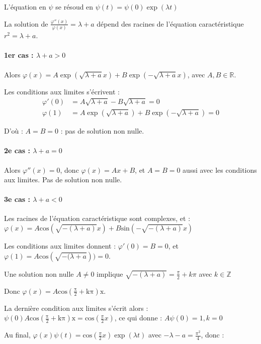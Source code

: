 \documentclass[french]{article}
\begin{document}
L'équation en $ \psi $ se résoud en $ \psi(t)=\psi(0)\exp(\lambda t) $

La solution de $ \frac{\varphi''(x)}{\varphi(x)}=\lambda+a $ dépend des racines de l'équation caractéristique $ r^{2}=\lambda+a $.

\paragraph{1er cas : $\lambda + a > 0$}

Alors $ \varphi(x)=A\exp(\sqrt{\lambda+a}x)+B\exp(-\sqrt{\lambda+a}x) $, avec $ A,B \in \mathbb{R} $.

Les conditions aux limites s'écrivent :
\begin{align}
\varphi'(0)&=A \sqrt{\lambda+a} - B \sqrt{\lambda+a}=0 \\
\varphi(1)&= A\exp(\sqrt{\lambda+a})+B\exp(-\sqrt{\lambda+a})=0 
\end{align}

D'où : $ A = B = 0 $ : pas de solution non nulle.

\paragraph{2e cas : $\lambda + a = 0$}

Alors $ \varphi''(x)=0 $, donc $ \varphi(x)=Ax+B $, et $ A=B=0 $ aussi avec les conditions aux limites. Pas de solution non nulle.

\paragraph{3e cas : $\lambda + a < 0$}

Les racines de l'équation caractéristique sont complexes, et : $ \varphi(x)=A\mathrm{cos}(\sqrt{-(\lambda+a)}x)+B\mathrm{sin}(-\sqrt{-(\lambda+a)}x) $

Les conditions aux limites donnent : $ \varphi'(0)=B=0 $, et $ \varphi(1)=A \mathrm{cos}(\sqrt{-(\lambda+a}))=0 $. 

Une solution non nulle $ A\neq 0 $ implique $ \sqrt{-(\lambda+a)} = \frac{\pi}{2}+k\pi $ avec $ k \in \mathbb{Z} $

Donc $ \varphi(x)=A\mathrm{cos(\frac{\pi}{2}+k\pi)x} $.

La dernière condition aux limites s'écrit alors : $ \psi(0)A \mathrm{cos(\frac{\pi}{2}+k\pi)x} = \mathrm{cos}(\frac{\pi}{2}x)$, ce qui donne : $ A\psi(0)=1, k=0 $

Au final, $ \varphi(x)\psi(t) = \mathrm{cos}(\frac{\pi}{2}x)\exp(\lambda t) $ avec $ -\lambda - a = \frac{\pi^{2}}{4} $, donc :
\end{document}
